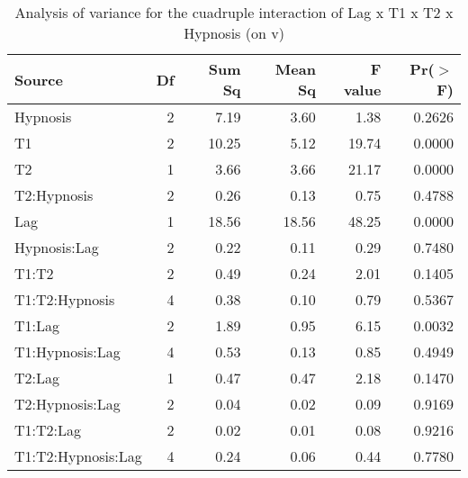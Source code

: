 \documentclass{article}
\begin{document}


\begin{table}
\caption{Analysis of variance for the cuadruple interaction of Lag x T1 x T2 x Hypnosis (on v)}
\centering
\begin{tabular}{lrrrrr}
  \hline
Source & Df & Sum Sq & Mean Sq & F value & Pr($>$F) \\ 
  \hline
Hypnosis    & 2 & 7.19 & 3.60 & 1.38 & 0.2626 \\
  \rowcolor{Gray}
  T1        & 2 & 10.25 & 5.12 & 19.74 & 0.0000 \\
  \rowcolor{Gray}
  T2        & 1 & 3.66 & 3.66 & 21.17 & 0.0000 \\ 
  T2:Hypnosis & 2 & 0.26 & 0.13 & 0.75 & 0.4788 \\
  \rowcolor{Gray}
  Lag        & 1 & 18.56 & 18.56 & 48.25 & 0.0000 \\ 
  Hypnosis:Lag & 2 & 0.22 & 0.11 & 0.29 & 0.7480 \\ 
  T1:T2        & 2 & 0.49 & 0.24 & 2.01 & 0.1405 \\ 
  T1:T2:Hypnosis & 4 & 0.38 & 0.10 & 0.79 & 0.5367 \\
  \rowcolor{Gray}
  T1:Lag        & 2 & 1.89 & 0.95 & 6.15 & 0.0032 \\ 
  T1:Hypnosis:Lag & 4 & 0.53 & 0.13 & 0.85 & 0.4949 \\ 
  T2:Lag        & 1 & 0.47 & 0.47 & 2.18 & 0.1470 \\ 
  T2:Hypnosis:Lag & 2 & 0.04 & 0.02 & 0.09 & 0.9169 \\ 
  T1:T2:Lag        & 2 & 0.02 & 0.01 & 0.08 & 0.9216 \\ 
  T1:T2:Hypnosis:Lag & 4 & 0.24 & 0.06 & 0.44 & 0.7780 \\ 
   \hline
\end{tabular}
\end{table}
\end{document}
